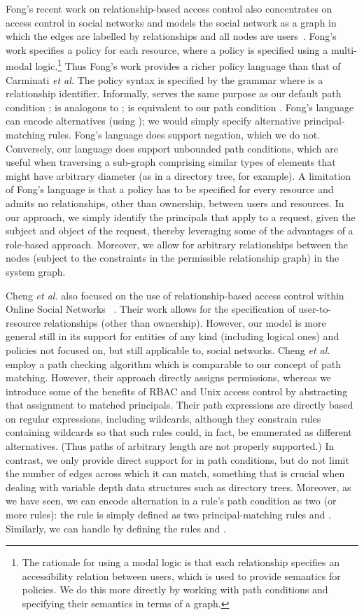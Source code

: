 \documentclass{article}
\begin{document}
Fong's recent work on relationship-based access control also concentrates on access control in social networks and models the social network as a graph in which the edges are labelled by relationships and all nodes are users~\cite{Fong_ReBAC,Fong_ESORICS09}.
Fong's work specifies a policy for each resource, where a policy is specified using a multi-modal logic.\footnote{The rationale for using a modal logic is that each relationship specifies an accessibility relation between users, which is used to provide semantics for policies.  We do this more directly by working with path conditions and specifying their semantics in terms of a graph.}
Thus Fong's work provides a richer policy language than that of Carminati {\em et al.}
The policy syntax is specified by the grammar  where  is a relationship identifier.
Informally,  serves the same purpose as our default path condition ;  is analogous to ;  is equivalent to our path condition .
Fong's language can encode alternatives (using ); we would simply specify alternative principal-matching rules.
Fong's language does support negation, which we do not.
Conversely, our language does support unbounded path conditions, which are useful when traversing a sub-graph comprising similar types of elements that might have arbitrary diameter (as in a directory tree, for example).
A limitation of Fong's language is that a policy has to be specified for every resource and admits no relationships, other than ownership, between users and resources.
In our approach, we simply identify the principals that apply to a request, given the subject and object of the request, thereby leveraging some of the advantages of a role-based approach.
Moreover, we allow for arbitrary relationships between the nodes (subject to the constraints in the permissible relationship graph) in the system graph.

Cheng {\em et al.} also focused on the use of relationship-based access control within Online Social Networks ~\cite{ChengPS12passat,ChengPS12dbsec}.
Their work allows for the specification of user-to-resource relationships (other than ownership).
However, our model is more general still in its support for entities of any kind (including logical ones) and policies not focused on, but still applicable to, social networks.
Cheng {\em et al.} employ a path checking algorithm which is comparable to our concept of path matching.
However, their approach directly assigns permissions, whereas we introduce some of the benefits of RBAC and Unix access control by abstracting that assignment to matched principals.
Their path expressions are directly based on regular expressions, including wildcards, although they constrain rules containing wildcards so that such rules could, in fact, be enumerated as different alternatives.
(Thus paths of arbitrary length are not properly supported.)
In contrast, we only provide direct support for  in path conditions, but do not limit the number of edges across which it can match, something that is crucial when dealing with variable depth data structures such as directory trees.
Moreover, as we have seen, we can encode alternation in a rule's path condition as two (or more rules): the rule  is simply defined as two principal-matching rules  and .
Similarly, we can handle  by defining the rules  and .
\end{document}
